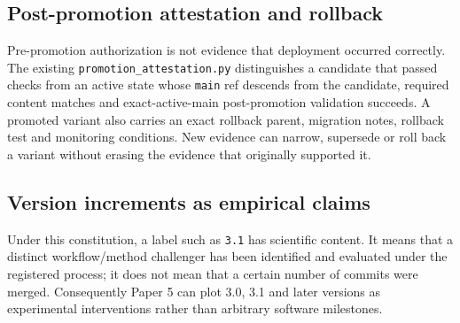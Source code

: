 \subsection{Post-promotion attestation and rollback}

Pre-promotion authorization is not evidence that deployment occurred correctly. The existing \texttt{promotion\_attestation.py} distinguishes a candidate that passed checks from an active state whose \texttt{main} ref descends from the candidate, required content matches and exact-active-main post-promotion validation succeeds. A promoted variant also carries an exact rollback parent, migration notes, rollback test and monitoring conditions. New evidence can narrow, supersede or roll back a variant without erasing the evidence that originally supported it.

\subsection{Version increments as empirical claims}

Under this constitution, a label such as \texttt{3.1} has scientific content. It means that a distinct workflow/method challenger has been identified and evaluated under the registered process; it does not mean that a certain number of commits were merged. Consequently Paper 5 can plot \RAKL{} 3.0, 3.1 and later versions as experimental interventions rather than arbitrary software milestones.